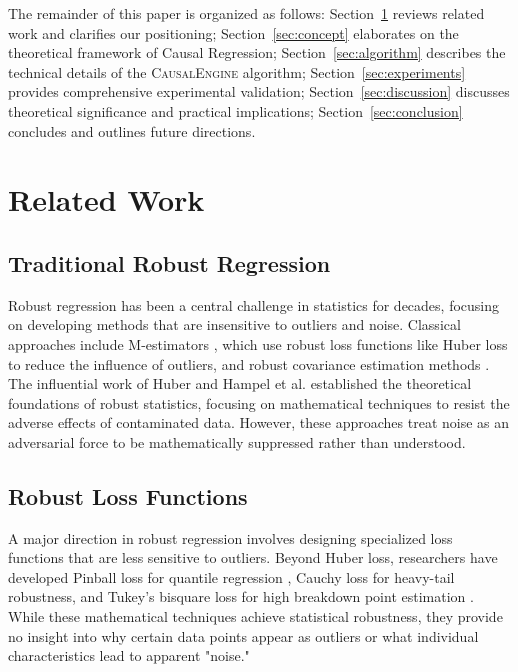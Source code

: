 \documentclass[conference]{IEEEtran}
\newcommand{\causalengine}{\textsc{CausalEngine}}
\begin{document}
The remainder of this paper is organized as follows: Section~\ref{sec:related} reviews related work and clarifies our positioning; Section~\ref{sec:concept} elaborates on the theoretical framework of Causal Regression; Section~\ref{sec:algorithm} describes the technical details of the \causalengine{} algorithm; Section~\ref{sec:experiments} provides comprehensive experimental validation; Section~\ref{sec:discussion} discusses theoretical significance and practical implications; Section~\ref{sec:conclusion} concludes and outlines future directions.

\section{Related Work}
\label{sec:related}

\subsection{Traditional Robust Regression}
Robust regression has been a central challenge in statistics for decades, focusing on developing methods that are insensitive to outliers and noise. Classical approaches include M-estimators \cite{huber1964robust}, which use robust loss functions like Huber loss to reduce the influence of outliers, and robust covariance estimation methods \cite{rousseeuw1987robust}. The influential work of Huber \cite{huber2009robust} and Hampel et al. \cite{hampel1986robust} established the theoretical foundations of robust statistics, focusing on mathematical techniques to resist the adverse effects of contaminated data. However, these approaches treat noise as an adversarial force to be mathematically suppressed rather than understood.

\subsection{Robust Loss Functions}
A major direction in robust regression involves designing specialized loss functions that are less sensitive to outliers. Beyond Huber loss, researchers have developed Pinball loss for quantile regression \cite{koenker1978regression}, Cauchy loss for heavy-tail robustness, and Tukey's bisquare loss for high breakdown point estimation \cite{maronna2019robust}. While these mathematical techniques achieve statistical robustness, they provide no insight into why certain data points appear as outliers or what individual characteristics lead to apparent "noise."
\end{document}
